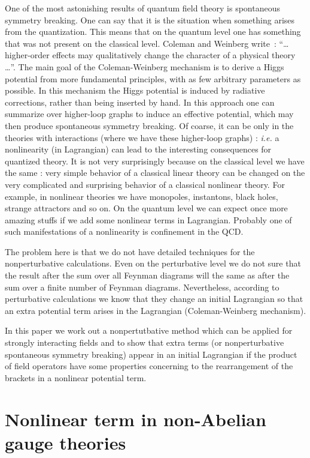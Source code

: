 \documentclass[a4paper,a4paper]{article}
\begin{document}
One of the most astonishing results of quantum field theory is 
spontaneous symmetry breaking. One can say that it is the situation 
when something arises from the quantization. 
This means that on the quantum level one has something that was
not present on the classical level. Coleman and 
Weinberg \cite{coleman} write~: ``\dots higher-order effects may 
qualitatively change 
the character of a physical theory  \dots''. The main goal of the 
Coleman-Weinberg mechanism is to derive a Higgs potential from 
more fundamental principles, with as few arbitrary parameters as 
possible. In this mechanism the Higgs potential is induced by radiative 
corrections, rather than being inserted by hand. In this approach one can 
summarize over higher-loop graphs to induce an effective potential, 
which may then produce spontaneous symmetry breaking. 
Of coarse, it can be only in the theories with interactions 
(where we have these higher-loop graphs) : \textit{i.e.} a nonlinearity 
(in Lagrangian) can lead to the interesting consequences 
for quantized theory. 
It is not very surprisingly because on the classical level we have the 
same : very simple behavior of a classical linear theory can be changed 
on the very complicated and surprising behavior of a classical nonlinear 
theory. For example, in nonlinear theories we have monopoles, instantons, 
black holes, 
strange attractors and so on. On the quantum level we can expect once 
more amazing stuffs if we add some nonlinear terms in Lagrangian. 
Probably one of such manifestations of a nonlinearity is confinement 
in the QCD. 
\par 
The problem here is that we do not have detailed techniques for the 
nonperturbative calculations. Even on the perturbative level we do not 
sure that the result after the sum over all Feynman diagrams will the 
same as after the sum over a finite number of Feynman diagrams. 
Nevertheless, according to perturbative calculations we know that they change 
an initial Lagrangian so that an extra potential 
term arises in the Lagrangian (Coleman-Weinberg mechanism). 
\par 
In this paper we work out a nonpertutbative method which 
can be applied for strongly interacting fields and to show that extra terms 
(or nonperturbative spontaneous symmetry breaking) appear in an initial 
Lagrangian if the product of field operators have some 
properties concerning to the rearrangement of the brackets in 
a nonlinear potential term. 

\section{Nonlinear term in non-Abelian gauge theories}
\end{document}
